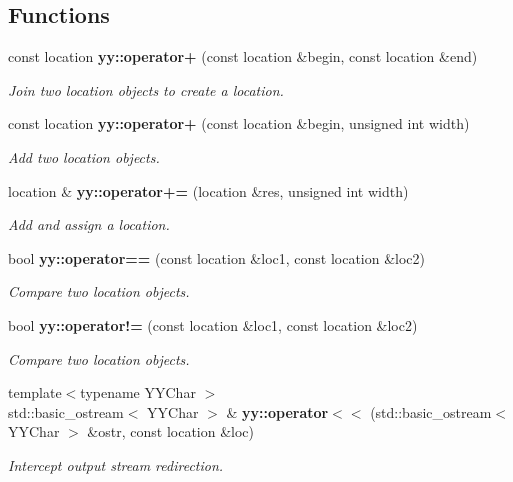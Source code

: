 \subsection*{Functions}
\begin{DoxyCompactItemize}
\item 
\hypertarget{namespaceyy_a2d68df6e5746b9aca23e7445c7a558a8}{const location {\bfseries yy\-::operator+} (const location \&begin, const location \&end)}\label{namespaceyy_a2d68df6e5746b9aca23e7445c7a558a8}

\begin{DoxyCompactList}\small\item\em Join two location objects to create a location. \end{DoxyCompactList}\item 
\hypertarget{namespaceyy_a09401c271b0db8cdd3b70df37b5ac660}{const location {\bfseries yy\-::operator+} (const location \&begin, unsigned int width)}\label{namespaceyy_a09401c271b0db8cdd3b70df37b5ac660}

\begin{DoxyCompactList}\small\item\em Add two location objects. \end{DoxyCompactList}\item 
\hypertarget{namespaceyy_a1aff777296e27f3884d3e29cf409245c}{location \& {\bfseries yy\-::operator+=} (location \&res, unsigned int width)}\label{namespaceyy_a1aff777296e27f3884d3e29cf409245c}

\begin{DoxyCompactList}\small\item\em Add and assign a location. \end{DoxyCompactList}\item 
\hypertarget{namespaceyy_a466b6e3dcf6a743bb058bf4989b38047}{bool {\bfseries yy\-::operator==} (const location \&loc1, const location \&loc2)}\label{namespaceyy_a466b6e3dcf6a743bb058bf4989b38047}

\begin{DoxyCompactList}\small\item\em Compare two location objects. \end{DoxyCompactList}\item 
\hypertarget{namespaceyy_aa3a5c205bc084696bb894634ae9cce80}{bool {\bfseries yy\-::operator!=} (const location \&loc1, const location \&loc2)}\label{namespaceyy_aa3a5c205bc084696bb894634ae9cce80}

\begin{DoxyCompactList}\small\item\em Compare two location objects. \end{DoxyCompactList}\item 
{\footnotesize template$<$typename Y\-Y\-Char $>$ }\\std\-::basic\-\_\-ostream$<$ Y\-Y\-Char $>$ \& {\bfseries yy\-::operator$<$$<$} (std\-::basic\-\_\-ostream$<$ Y\-Y\-Char $>$ \&ostr, const location \&loc)
\begin{DoxyCompactList}\small\item\em Intercept output stream redirection. \end{DoxyCompactList}\end{DoxyCompactItemize}


